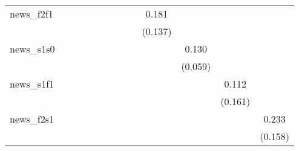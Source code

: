 {\begin{tabular}{l*{12}{c}}
\addlinespace
news\_f2f1   &                     &                     &                     &                     &                     &                     &                     &                     &       0.181         &                     &                     &                     \\
            &                     &                     &                     &                     &                     &                     &                     &                     &     (0.137)         &                     &                     &                     \\
\addlinespace
news\_s1s0   &                     &                     &                     &                     &                     &                     &                     &                     &                     &       0.130\sym{**} &                     &                     \\
            &                     &                     &                     &                     &                     &                     &                     &                     &                     &     (0.059)         &                     &                     \\
\addlinespace
news\_s1f1   &                     &                     &                     &                     &                     &                     &                     &                     &                     &                     &       0.112         &                     \\
            &                     &                     &                     &                     &                     &                     &                     &                     &                     &                     &     (0.161)         &                     \\
\addlinespace
news\_f2s1   &                     &                     &                     &                     &                     &                     &                     &                     &                     &                     &                     &       0.233         \\
            &                     &                     &                     &                     &                     &                     &                     &                     &                     &                     &                     &     (0.158)         \\

\end{tabular}}
